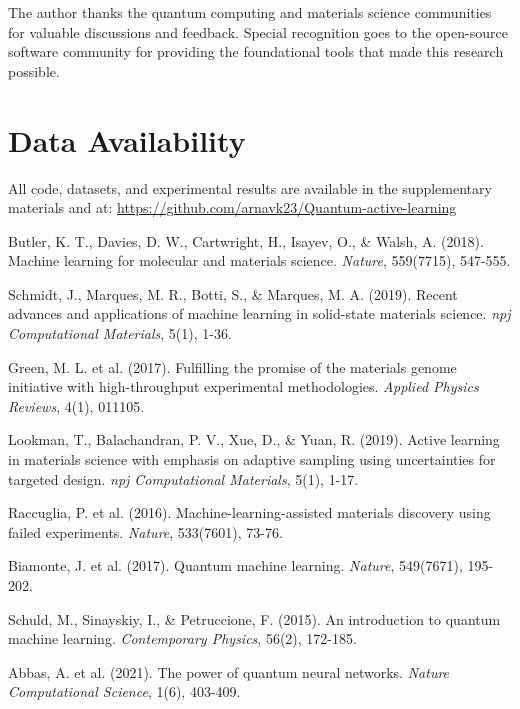 \documentclass[twocolumn]{article}
\begin{document}
The author thanks the quantum computing and materials science communities for valuable discussions and feedback. Special recognition goes to the open-source software community for providing the foundational tools that made this research possible.

\section*{Data Availability}

All code, datasets, and experimental results are available in the supplementary materials and at: \url{https://github.com/arnavk23/Quantum-active-learning}


\begin{thebibliography}{20}

Butler, K. T., Davies, D. W., Cartwright, H., Isayev, O., \& Walsh, A. (2018). Machine learning for molecular and materials science. \textit{Nature}, 559(7715), 547-555.

Schmidt, J., Marques, M. R., Botti, S., \& Marques, M. A. (2019). Recent advances and applications of machine learning in solid-state materials science. \textit{npj Computational Materials}, 5(1), 1-36.

Green, M. L. et al. (2017). Fulfilling the promise of the materials genome initiative with high-throughput experimental methodologies. \textit{Applied Physics Reviews}, 4(1), 011105.

Lookman, T., Balachandran, P. V., Xue, D., \& Yuan, R. (2019). Active learning in materials science with emphasis on adaptive sampling using uncertainties for targeted design. \textit{npj Computational Materials}, 5(1), 1-17.

Raccuglia, P. et al. (2016). Machine-learning-assisted materials discovery using failed experiments. \textit{Nature}, 533(7601), 73-76.

Biamonte, J. et al. (2017). Quantum machine learning. \textit{Nature}, 549(7671), 195-202.

Schuld, M., Sinayskiy, I., \& Petruccione, F. (2015). An introduction to quantum machine learning. \textit{Contemporary Physics}, 56(2), 172-185.

Abbas, A. et al. (2021). The power of quantum neural networks. \textit{Nature Computational Science}, 1(6), 403-409.


\end{thebibliography}
\end{document}
